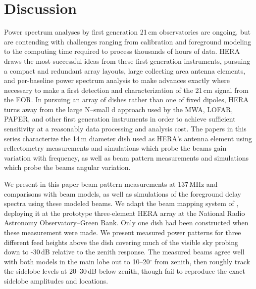 \documentclass[preprint]{aastex}
\begin{document}
\section{Discussion}


Power spectrum analyses by first generation 21\,cm observatories are ongoing, but are contending with challenges ranging from calibration and foreground modeling to the computing time required to process thousands of hours of data. HERA draws the most successful ideas from these first generation instruments, pursuing a compact and redundant array layouts, large collecting area antenna elements, and per-baseline power spectrum analysis to make advances exactly where necessary to make a first detection and characterization of the 21\,cm signal from the EOR. In pursuing an array of dishes rather than one of fixed dipoles, HERA turns away from the large N--small d approach used by the MWA, LOFAR, PAPER, and other first generation instruments in order to achieve sufficient sensitivity at a reasonably data processing and analysis cost. The papers in this series characterize the 14\,m diameter dish used as HERA's antenna element using reflectometry measurements and simulations which probe the beams gain variation with frequency, as well as beam pattern measurements and simulations which probe the beams angular variation. 


We present in this paper beam pattern measurements at 137\,MHz and comparisons with beam models, as well as simulations of the foreground delay spectra using these modeled beams. We adapt the beam mapping system of \citet{neben15}, deploying it at the prototype three-element HERA array at the National Radio Astronomy Observatory--Green Bank. Only one dish had been constructed when these measurement were made. We present measured power patterns for three different feed heights above the dish covering much of the visible sky probing down to -30\,dB relative to the zenith response. The measured beams agree well with both models in the main lobe out to 10--20$^\circ$ from zenith, then roughly track the sidelobe levels at 20--30\,dB below zenith, though fail to reproduce the exact sidelobe amplitudes and locations. 
\end{document}
